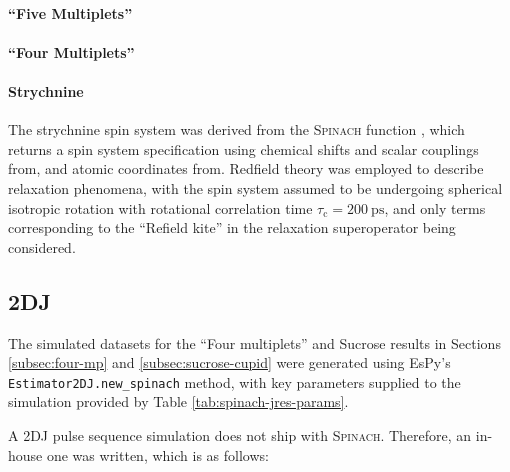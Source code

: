 \paragraph{``Five Multiplets''}

\paragraph{``Four Multiplets''}

\paragraph{Strychnine}
The strychnine spin system was derived from
the \textsc{Spinach} function , which returns a
spin system specification using chemical shifts and scalar couplings
from\cite[Appendix 5]{Berger2004}, and atomic coordinates
from\cite[Supplementary Material]{Butts2011}.
Redfield theory was employed to describe relaxation phenomena, with the spin
system assumed to be undergoing spherical isotropic rotation with rotational
correlation time $\tau_{\text{c}} = \qty{200}{\pico\second}$, and only terms
corresponding to the ``Refield kite'' in the relaxation superoperator being
considered\cite[Chapter 5]{Cavanagh2007}.




\subsection{\acs{2DJ}}
The simulated datasets for the ``Four multiplets'' and Sucrose results in
Sections \ref{subsec:four-mp} and \ref{subsec:sucrose-cupid} were generated
using \ac{EsPy}'s \texttt{Estimator2DJ.new_spinach} method, with
key parameters supplied to the simulation provided by Table
\ref{tab:spinach-jres-params}.



A \ac{2DJ} pulse sequence simulation does not ship with \textsc{Spinach}.
Therefore, an in-house one was written, which is as follows:


